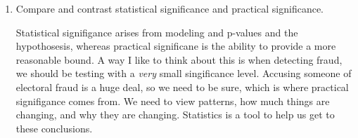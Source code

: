 \begin{enumerate}
 \item Compare and contrast statistical significance and practical significance.
\begin{solution}
Statistical signifigance arises from modeling and p-values and the hypothosesis, whereas practical significane is the ability to provide a more reasonable bound. A way I like to think about this is when detecting fraud, we should be testing with a \emph{very} small singificance level. Accusing someone of electoral fraud is a huge deal, so we need to be sure, which is where practical signifigance comes from. We need to view patterns, how much things are changing, and why they are changing. Statistics is a tool to help us get to these conclusions. 
\end{solution}

\end{enumerate}



